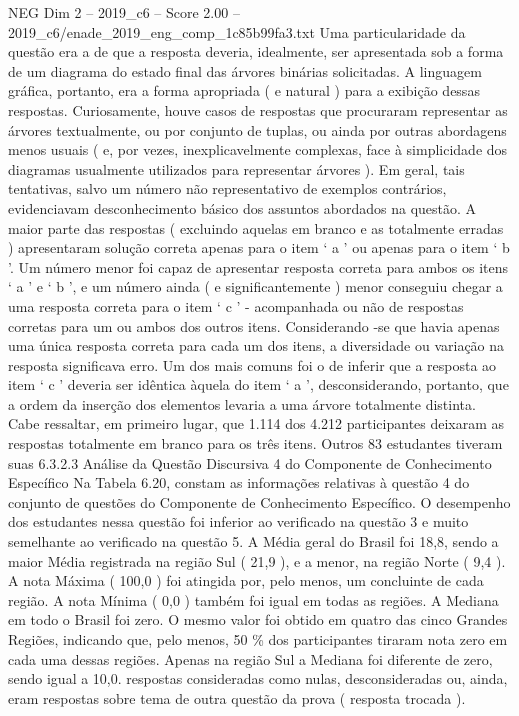 \begin{textsample}{NEG Dim 2 – 2019\_c6 – Score 2.00 – 2019\_c6/enade\_2019\_eng\_comp\_1c85b99fa3.txt}
Uma particularidade da questão era a de que a resposta deveria, idealmente, ser apresentada sob a forma de um diagrama do estado final das árvores binárias solicitadas.
A linguagem gráfica, portanto, era a forma apropriada ( e natural ) para a exibição dessas respostas.
Curiosamente, houve casos de respostas que procuraram representar as árvores textualmente, ou por conjunto de tuplas, ou ainda por outras abordagens menos usuais ( e, por vezes, inexplicavelmente complexas, face à simplicidade dos diagramas usualmente utilizados para representar árvores ).
Em geral, tais tentativas, salvo um número não representativo de exemplos contrários, evidenciavam desconhecimento básico dos assuntos abordados na questão.
A maior parte das respostas ( excluindo aquelas em branco e as totalmente erradas ) apresentaram solução correta apenas para o item ‘ a ’ ou apenas para o item ‘ b ’.
Um número menor foi capaz de apresentar resposta correta para ambos os itens ‘ a ’ e ‘ b ’, e um número ainda ( e significantemente ) menor conseguiu chegar a uma resposta correta para o item ‘ c ’ - acompanhada ou não de respostas corretas para um ou ambos dos outros itens.
Considerando -se que havia apenas uma única resposta correta para cada um dos itens, a diversidade ou variação na resposta significava erro.
Um dos mais comuns foi o de inferir que a resposta ao item ‘ c ’ deveria ser idêntica àquela do item ‘ a ’, desconsiderando, portanto, que a ordem da inserção dos elementos levaria a uma árvore totalmente distinta.
Cabe ressaltar, em primeiro lugar, que 1.114 dos 4.212 participantes deixaram as respostas totalmente em branco para os três itens.
Outros 83 estudantes tiveram suas 6.3.2.3 Análise da Questão Discursiva 4 do Componente de Conhecimento Específico Na Tabela 6.20, constam as informações relativas à questão 4 do conjunto de questões do Componente de Conhecimento Específico.
O desempenho dos estudantes nessa questão foi inferior ao verificado na questão 3 e muito semelhante ao verificado na questão 5.
A Média geral do Brasil foi 18,8, sendo a maior Média registrada na região Sul ( 21,9 ), e a menor, na região Norte ( 9,4 ).
A nota Máxima ( 100,0 ) foi atingida por, pelo menos, um concluinte de cada região.
A nota Mínima ( 0,0 ) também foi igual em todas as regiões.
A Mediana em todo o Brasil foi zero.
O mesmo valor foi obtido em quatro das cinco Grandes Regiões, indicando que, pelo menos, 50 \% dos participantes tiraram nota zero em cada uma dessas regiões.
Apenas na região Sul a Mediana foi diferente de zero, sendo igual a 10,0. respostas consideradas como nulas, desconsideradas ou, ainda, eram respostas sobre tema de outra questão da prova ( resposta trocada ).

\end{textsample}
